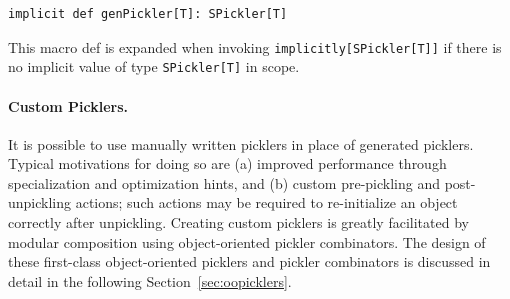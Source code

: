 \documentclass[10pt]{sigplanconf}
\theoremstyle{definition}
\theoremstyle{definition}
\begin{document}
\begin{lstlisting}
implicit def genPickler[T]: SPickler[T]
\end{lstlisting}

This macro def is expanded when invoking \newline
\verb|implicitly[SPickler[T]]| if
there is no implicit value of type \verb|SPickler[T]| in scope.


\paragraph{Custom Picklers.} It is possible to use manually written picklers
in place of generated picklers. Typical motivations for doing so are (a)
improved performance through specialization and optimization hints, and (b) custom pre-pickling and post-unpickling
actions; such actions may be required to re-initialize an object
correctly after unpickling. Creating custom picklers is greatly facilitated by
modular composition using object-oriented pickler combinators. The design of
these first-class object-oriented picklers and pickler combinators is
discussed in detail in the following Section~\ref{sec:oopicklers}.




\end{document}
